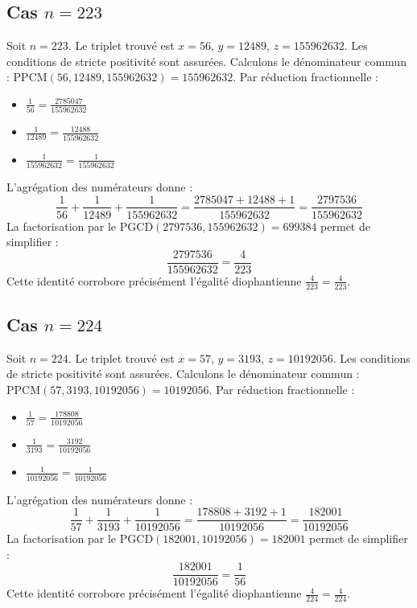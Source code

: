 \documentclass[11pt,a4paper]{article}
\begin{document}
\subsection{Cas $n = 223$}
Soit $n = 223$. Le triplet trouvé est $x = 56$, $y = 12489$, $z = 155962632$.
Les conditions de stricte positivité sont assurées.
Calculons le dénominateur commun : $\text{PPCM}(56, 12489, 155962632) = 155962632$.
Par réduction fractionnelle :
\begin{itemize}
    \item $\frac{1}{56} = \frac{2785047}{155962632}$
    \item $\frac{1}{12489} = \frac{12488}{155962632}$
    \item $\frac{1}{155962632} = \frac{1}{155962632}$
\end{itemize}
L'agrégation des numérateurs donne :
$$ \frac{1}{56} + \frac{1}{12489} + \frac{1}{155962632} = \frac{2785047 + 12488 + 1}{155962632} = \frac{2797536}{155962632} $$
La factorisation par le $\text{PGCD}(2797536, 155962632) = 699384$ permet de simplifier :
$$ \frac{2797536}{155962632} = \frac{4}{223} $$
Cette identité corrobore précisément l'égalité diophantienne $\frac{4}{223} = \frac{4}{223}$.

\subsection{Cas $n = 224$}
Soit $n = 224$. Le triplet trouvé est $x = 57$, $y = 3193$, $z = 10192056$.
Les conditions de stricte positivité sont assurées.
Calculons le dénominateur commun : $\text{PPCM}(57, 3193, 10192056) = 10192056$.
Par réduction fractionnelle :
\begin{itemize}
    \item $\frac{1}{57} = \frac{178808}{10192056}$
    \item $\frac{1}{3193} = \frac{3192}{10192056}$
    \item $\frac{1}{10192056} = \frac{1}{10192056}$
\end{itemize}
L'agrégation des numérateurs donne :
$$ \frac{1}{57} + \frac{1}{3193} + \frac{1}{10192056} = \frac{178808 + 3192 + 1}{10192056} = \frac{182001}{10192056} $$
La factorisation par le $\text{PGCD}(182001, 10192056) = 182001$ permet de simplifier :
$$ \frac{182001}{10192056} = \frac{1}{56} $$
Cette identité corrobore précisément l'égalité diophantienne $\frac{4}{224} = \frac{4}{224}$.
\end{document}
